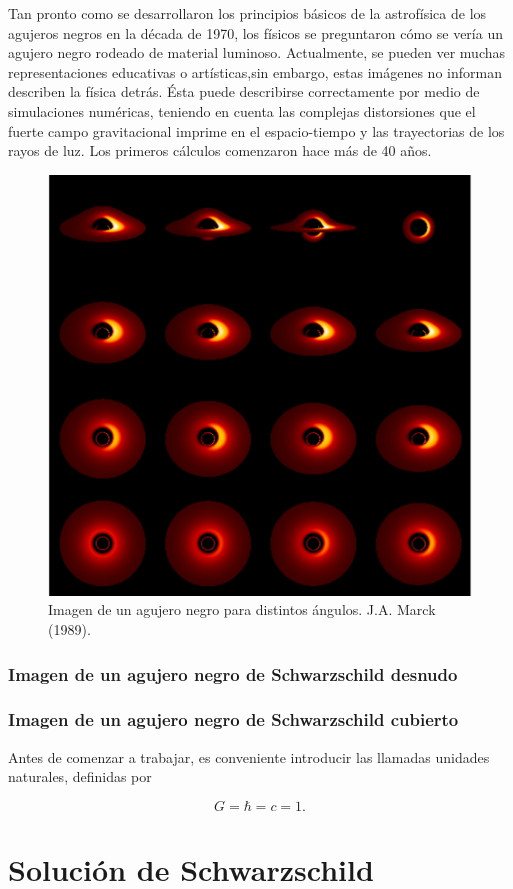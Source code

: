 \documentclass[10pt]{article}
\begin{document}
Tan pronto como se desarrollaron los principios básicos de la astrofísica de los agujeros negros en la década de 1970, los físicos se preguntaron cómo se vería un agujero negro rodeado de material luminoso. Actualmente, se pueden ver muchas representaciones educativas o artísticas,sin embargo, estas imágenes no informan describen la física detrás. Ésta puede describirse correctamente por medio de simulaciones numéricas, teniendo en cuenta las complejas distorsiones que el fuerte campo gravitacional imprime en el espacio-tiempo y las trayectorias de los rayos de luz. Los primeros cálculos comenzaron hace más de 40 años.


\begin{figure}[H]
	\centering
	\includegraphics[width=0.5\linewidth]{Images/marck_1989}
	\caption{Imagen de un agujero negro para distintos ángulos. J.A. Marck (1989).}
	\label{fig:marck1989}
\end{figure}

\subsubsection{Imagen de un agujero negro de Schwarzschild desnudo}

\subsubsection{Imagen de un agujero negro de Schwarzschild cubierto}

Antes de comenzar a trabajar, es conveniente introducir las llamadas unidades naturales, definidas por

\begin{equation}
G = \hbar = c = 1.
\label{ec:unidades naturales}
\end{equation}


\section{Solución de Schwarzschild}
\end{document}

